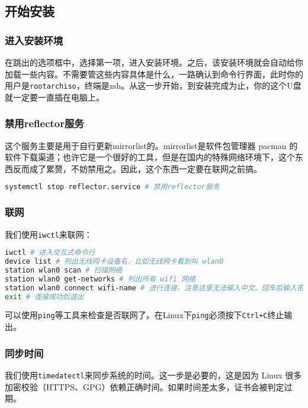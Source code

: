 \documentclass[../main.tex]{subfiles}
\begin{document}
\subsection{开始安装}

\subsubsection{进入安装环境}

在跳出的选项框中，选择第一项，进入安装环境。之后，该安装环境就会自动给你加载一些内容。不需要管这些内容具体是什么，一路确认到命令行界面，此时你的用户是\texttt{root\@ archiso}，终端是zsh。从这一步开始，到安装完成为止，你的这个U盘就一定要一直插在电脑上。

\subsubsection{禁用reflector服务}

这个服务主要是用于自行更新mirrorlist的。mirrorlist是软件包管理器 pacman 的软件下载渠道；也许它是一个很好的工具，但是在国内的特殊网络环境下，这个东西反而成了累赘，不妨禁用之。因此，这个东西一定要在联网之前搞。

\begin{lstlisting}[language=bash]
  systemctl stop reflector.service # 禁用reflector服务
\end{lstlisting}

\subsubsection{联网}

我们使用\texttt{iwctl}来联网：

\begin{lstlisting}[language=bash]
iwctl # 进入交互式命令行
device list # 列出无线网卡设备名，比如无线网卡看到叫 wlan0
station wlan0 scan # 扫描网络
station wlan0 get-networks # 列出所有 wifi 网络
station wlan0 connect wifi-name # 进行连接，注意这里无法输入中文。回车后输入密码即可
exit # 连接成功后退出
\end{lstlisting}

可以使用\texttt{ping}等工具来检查是否联网了。在Linux下\texttt{ping}必须按下\texttt{Ctrl+C}终止输出。

\subsubsection{同步时间}

我们使用\texttt{timedatectl}来同步系统的时间。这一步是必要的，这是因为 Linux 很多加密校验（HTTPS、GPG）依赖正确时间。如果时间差太多，证书会被判定过期。
\end{document}
